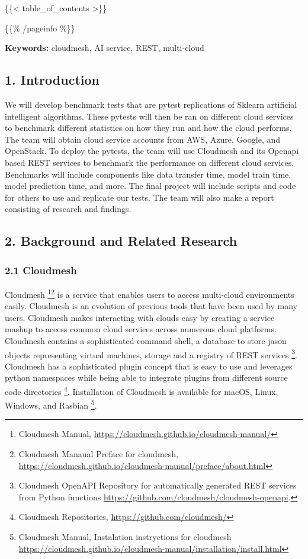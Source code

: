 \{\{\textless{} table\_of\_contents \textgreater\}\}

\{\{\% /pageinfo \%\}\}

\textbf{Keywords:} cloudmesh, AI service, REST, multi-cloud

\hypertarget{introduction}{%
\subsection{1. Introduction}\label{introduction}}

We will develop benchmark tests that are pytest replications of Sklearn
artificial intelligent algorithms. These pytests will then be ran on
different cloud services to benchmark different statistics on how they
run and how the cloud performs. The team will obtain cloud service
accounts from AWS, Azure, Google, and OpenStack. To deploy the pytests,
the team will use Cloudmesh and its Openapi based REST services to
benchmark the performance on different cloud services. Benchmarks will
include components like data transfer time, model train time, model
prediction time, and more. The final project will include scripts and
code for others to use and replicate our tests. The team will also make
a report consisting of research and findings.

\hypertarget{background-and-related-research}{%
\subsection{2. Background and Related
Research}\label{background-and-related-research}}

\hypertarget{cloudmesh}{%
\subsubsection{2.1 Cloudmesh}\label{cloudmesh}}

Cloudmesh \footnote{Cloudmesh Manual,
  \url{https://cloudmesh.github.io/cloudmesh-manual/}}\footnote{Cloudmesh
  Manaual Preface for cloudmesh,
  \url{https://cloudmesh.github.io/cloudmesh-manual/preface/about.html}}
is a service that enables users to access multi-cloud environments
easily. Cloudmesh is an evolution of previous tools that have been used
by many users. Cloudmesh makes interacting with clouds easy by creating
a service mashup to access common cloud services across numerous cloud
platforms. Cloudmesh contains a sophisticated command shell, a database
to store jason objects representing virtual machines, storage and a
registry of REST services \footnote{Cloudmesh OpenAPI Repository for
  automatically generated REST services from Python functions
  \url{https://github.com/cloudmesh/cloudmesh-openapi}.}. Cloudmesh has
a sophisticated plugin concept that is easy to use and leverages python
namespaces while being able to integrate plugins from different source
code directories \footnote{Cloudmesh Repositories,
  \url{https://github.com/cloudmesh/}}. Installation of Cloudmesh is
available for macOS, Linux, Windows, and Rasbian \footnote{Cloudmesh
  Manual, Instalation instryctions for cloudmesh
  \url{https://cloudmesh.github.io/cloudmesh-manual/installation/install.html}}.

